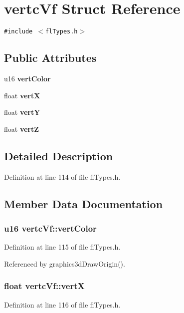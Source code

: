 \section{vertc\-Vf Struct Reference}
\label{structvertcVf}
{\tt \#include $<$fl\-Types.h$>$}

\subsection*{Public Attributes}
\begin{CompactItemize}
\item 
u16 {\bf vert\-Color}
\item 
float {\bf vert\-X}
\item 
float {\bf vert\-Y}
\item 
float {\bf vert\-Z}
\end{CompactItemize}


\subsection{Detailed Description}




Definition at line 114 of file fl\-Types.h.

\subsection{Member Data Documentation}
\subsubsection{\setlength{\rightskip}{0pt plus 5cm}u16 {\bf vertc\-Vf::vert\-Color}}\label{structvertcVf_b0aba3b269c7db4ecb6f3bd36916169b}




Definition at line 115 of file fl\-Types.h.

Referenced by graphics3d\-Draw\-Origin().
\subsubsection{\setlength{\rightskip}{0pt plus 5cm}float {\bf vertc\-Vf::vert\-X}}\label{structvertcVf_ff3504ee1a1b7ea78b05fe2bf49bc056}




Definition at line 116 of file fl\-Types.h.

